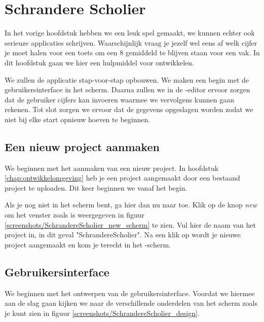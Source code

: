 \chapter{Schrandere Scholier}

In het vorige hoofdstuk hebben we een leuk spel gemaakt, we kunnen echter ook serieuze applicaties schrijven. Waarschijnlijk vraag je jezelf wel eens af welk cijfer je moet halen voor een toets om een 8 gemiddeld te blijven staan voor een vak. In dit hoofdstuk gaan we hier een hulpmiddel voor ontwikkelen.

We zullen de applicatie stap-voor-stap opbouwen. We maken een begin met de gebruikersinterface in het  scherm. Daarna zullen we in de -editor ervoor zorgen dat de gebruiker cijfers kan invoeren waarmee we vervolgens kunnen gaan rekenen. Tot slot zorgen we ervoor dat de gegevens opgeslagen worden zodat we niet bij elke start opnieuw hoeven te beginnen.

\section{Een nieuw project aanmaken}
We beginnen met het aanmaken van een nieuw project. In hoofdstuk \ref{chap:ontwikkelomgeving} heb je een project aangemaakt door een bestaand project te uploaden. Dit keer beginnen we vanaf het begin. 

Als je nog niet in het  scherm bent, ga hier dan nu naar toe. Klik op de knop \emph{new} om het venster zoals is weergegeven in figuur \ref{screenshots/SchrandereScholier_new_scherm} te zien. Vul hier de naam van het project in, in dit geval "SchrandereScholier". Na een klik op  wordt je nieuwe project aangemaakt en kom je terecht in het -scherm.

\section{Gebruikersinterface}
We beginnen met het ontwerpen van de gebruikersinterface. Voordat we hiermee aan de slag gaan kijken we naar de verschillende onderdelen van het scherm zoals je kunt zien in figuur \ref{screenshots/SchrandereScholier_design}.


